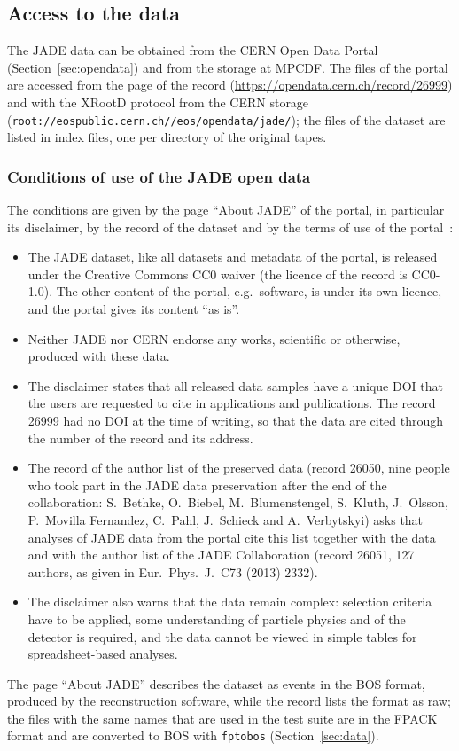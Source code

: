 \subsection{Access to the data}
\label{sec:access}

The JADE data can be obtained from the CERN Open Data Portal (Section~\ref{sec:opendata}) and from the storage at MPCDF.
The files of the portal are accessed from the page of the record (\url{https://opendata.cern.ch/record/26999}) and with the
XRootD protocol from the CERN storage (\texttt{root:/\allowbreak{}/\allowbreak{}eospublic.cern.ch/\allowbreak{}/\allowbreak{}eos/\allowbreak{}opendata/\allowbreak{}jade/\allowbreak{}}); the files of the dataset
are listed in index files, one per directory of the original tapes.

\subsubsection{Conditions of use of the JADE open data}
The conditions are given by the page ``About JADE'' of the portal, in particular its disclaimer, by the record of the dataset
and by the terms of use of the portal~\cite{CERN:OpenDataTerms}:
\begin{itemize}
\item The JADE dataset, like all datasets and metadata of the portal, is released under the Creative Commons CC0
waiver (the licence of the record is CC0-1.0). The other content of the portal, e.g.\ software, is under its own
licence, and the portal gives its content ``as is''.
\item Neither JADE nor CERN endorse any works, scientific or otherwise, produced with these data.
\item The disclaimer states that all released data samples have a unique DOI that the users are requested to cite in
applications and publications. The record 26999 had no DOI at the time of writing, so that the data are cited
through the number of the record and its address.
\item The record of the author list of the preserved data (record 26050, nine people who took part in the JADE data
preservation after the end of the collaboration: S.~Bethke, O.~Biebel, M.~Blumenstengel, S.~Kluth, J.~Olsson,
P.~Movilla Fernandez, C.~Pahl, J.~Schieck and A.~Verbytskyi) asks that analyses of JADE data from the portal cite this list
together with the data and with the author list of the JADE Collaboration (record 26051, 127 authors, as given in Eur.\
Phys.\ J.\ C73 (2013) 2332).
\item The disclaimer also warns that the data remain complex: selection criteria have to be applied, some understanding
of particle physics and of the detector is required, and the data cannot be viewed in simple tables for
spreadsheet-based analyses.
\end{itemize}
The page ``About JADE'' describes the dataset as events in the BOS format, produced by the reconstruction software, while
the record lists the format as raw; the files with the same names that are used in the test suite are in the FPACK
format and are converted to BOS with \texttt{fptobos} (Section~\ref{sec:data}).

